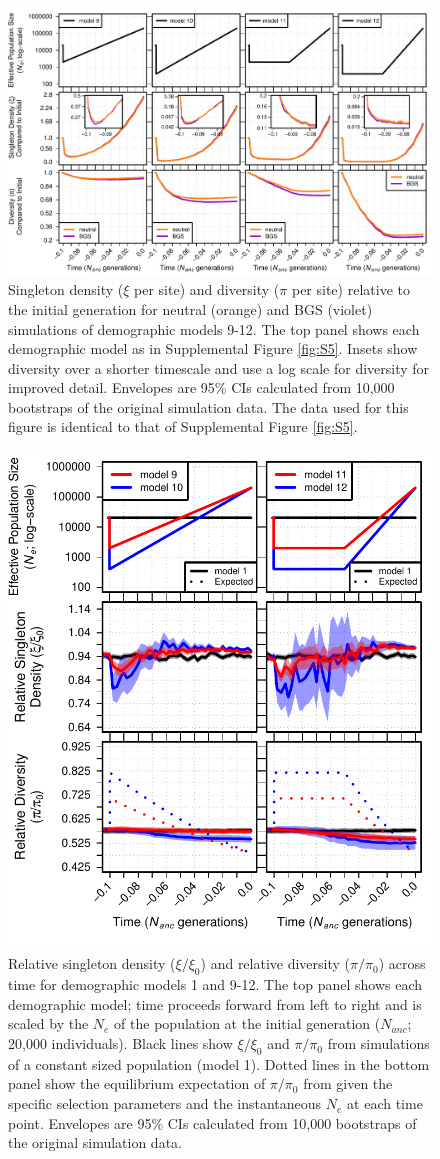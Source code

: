 \documentclass[9pt,twocolumn,twoside]{rilabRxiv}
\begin{document}
\begin{figure}[h!]
\includegraphics[width=0.8\linewidth]{figures/FigS8.pdf}
\caption{Singleton density ($\xi$ per site) and diversity ($\pi$ per site) relative to the initial generation for neutral (orange) and BGS (violet) simulations of demographic models 9-12.
The top panel shows each demographic model as in Supplemental Figure \ref{fig:S5}.
Insets show diversity over a shorter timescale and use a log scale for diversity for improved detail.
Envelopes are 95\% CIs calculated from 10,000 bootstraps of the original simulation data.
The data used for this figure is identical to that of Supplemental Figure \ref{fig:S5}.}
\label{fig:S8}
\end{figure}
\pagebreak

\begin{figure}[]
\includegraphics[width=0.5\linewidth]{figures/figsup912_newclean.pdf}
\caption{Relative singleton density ($\xi/\xi_0$) and relative diversity ($\pi/\pi_0$) across time for demographic models 1 and 9-12. The top panel shows each demographic model; time proceeds forward from left to right and is scaled by the $N_e$ of the population at the initial generation ($N_{anc}$; 20,000 individuals). Black lines show $\xi/\xi_0$ and $\pi/\pi_0$ from simulations of a constant sized population (model 1). Dotted lines in the bottom panel show the equilibrium expectation of $\pi/\pi_0$ from  \citet{nordborg1996effect} given the specific selection parameters and the instantaneous $N_e$ at each time point. Envelopes are 95\% CIs calculated from 10,000 bootstraps of the original simulation data.}
\label{fig:S912}
\end{figure}
\pagebreak
\end{document}
